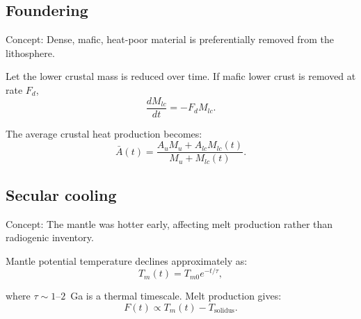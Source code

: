 \documentclass[11pt,a4paper]{article}
\begin{document}
\subsection*{Foundering}
Concept: Dense, mafic, heat-poor material is preferentially removed from the lithosphere.

Let the lower crustal mass is reduced over time.  If mafic lower crust is removed at rate $F_d$,
\[
\frac{dM_{lc}}{dt} = -F_d M_{lc}.
\]

The average crustal heat production becomes:
\[
\bar{A}(t) = \frac{A_u M_u + A_{lc} M_{lc}(t)}{M_u + M_{lc}(t)}.
\]



\subsection*{Secular cooling}
Concept: The mantle was hotter early, affecting melt production rather than radiogenic inventory.

Mantle potential temperature declines approximately as:
\[
T_m(t) = T_{m0} e^{-t/\tau},
\]

where \(\tau \sim 1\text{--}2\)~Ga is a thermal timescale.
Melt production gives:
\[
F(t) \propto T_m(t) - T_{\text{solidus}}.
\]


\end{document}
